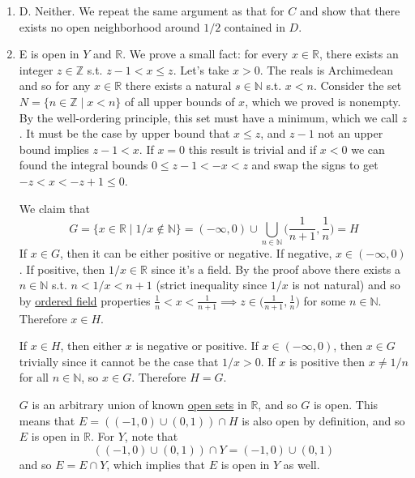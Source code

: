 \begin{solution}[Munkres 16.3]
\begin{enumerate}
      \item D. Neither. We repeat the same argument as that for $C$ and show that there exists no open neighborhood around $1/2$ contained in $D$. 

      \item E is open in $Y$ and $\mathbb{R}$. We prove a small fact: for every $x \in \mathbb{R}$, there exists an integer $z \in \mathbb{Z}$ s.t. $z - 1 < x \leq z$. Let's take $x > 0$. The reals is Archimedean and so for any $x \in \mathbb{R}$ there exists a natural $s \in \mathbb{N}$ s.t. $x < n$. Consider the set $N = \{n \in \mathbb{Z} \mid x < n\}$ of all upper bounds of $x$, which we proved is nonempty. By the well-ordering principle, this set must have a minimum, which we call $z$. It must be the case by upper bound that $x \leq z$, and $z-1$ not an upper bound implies $z-1 < x$. If $x = 0$ this result is trivial and if $x < 0$ we can found the integral bounds $0 \leq z - 1 < -x < z$ and swap the signs to get $-z < x < -z + 1 \leq 0$. 

      We claim that 
      \begin{equation}
        G = \{ x \in \mathbb{R} \mid 1/x \not\in \mathbb{N} \} = (-\infty, 0) \cup \bigcup_{n \in \mathbb{N}} \bigg( \frac{1}{n+1}, \frac{1}{n} \bigg) = H
      \end{equation} 
      If $x \in G$, then it can be either positive or negative. If negative, $x \in (-\infty, 0)$. If positive, then $1/x \in \mathbb{R}$ since it's a field. By the proof above there exists a $n \in \mathbb{N}$ s.t. $n < 1/x < n+1$ (strict inequality since $1/x$ is not natural) and so by \hyperref[alg-def:ordered-field]{ordered field} properties $\frac{1}{n} < x < \frac{1}{n+1} \implies z \in \big( \frac{1}{n+1}, \frac{1}{n} \big)$ for some $n \in \mathbb{N}$. Therefore $x \in H$. 

      If $x \in H$, then either $x$ is negative or positive. If $x \in (-\infty, 0)$, then $x \in G$ trivially since it cannot be the case that $1/x > 0$. If $x$ is positive then $x \neq 1/n$ for all $n \in \mathbb{N}$, so $x \in G$. Therefore $H = G$. 

      $G$ is an arbitrary union of known \hyperref[def:open-set]{open sets} in $\mathbb{R}$, and so $G$ is open. This means that $E = ((-1, 0) \cup (0, 1)) \cap H$ is also open by definition, and so $E$ is open in $\mathbb{R}$. For $Y$, note that 
      \begin{equation}
        ((-1, 0) \cup (0, 1)) \cap Y = (-1, 0) \cup (0, 1)
      \end{equation}
      and so $E = E \cap Y$, which implies that $E$ is open in $Y$ as well. 
    \end{enumerate}
  \end{solution}



